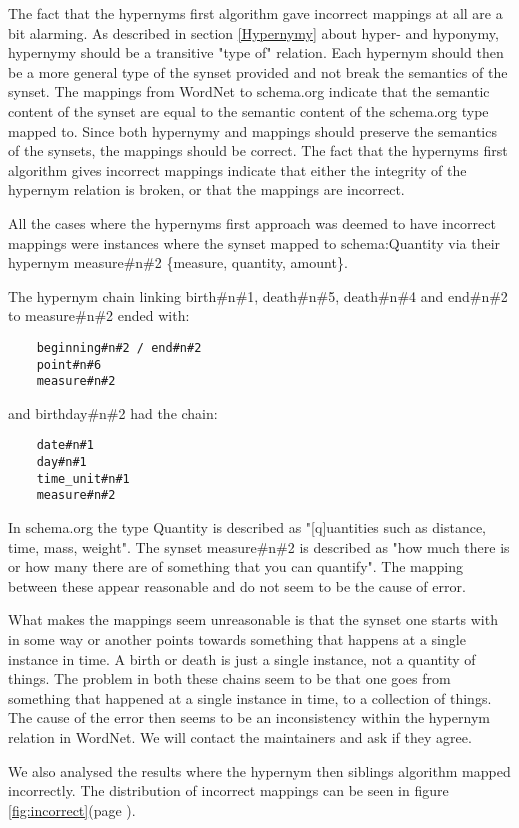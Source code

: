 The fact that the hypernyms first algorithm gave incorrect mappings at all are a bit alarming.
As described in section \ref{Hypernymy} about hyper- and hyponymy, hypernymy should be a transitive "type of" relation.
Each hypernym should then be a more general type of the synset provided and not break the semantics of the synset.
The mappings from WordNet to schema.org indicate that the semantic content of the synset are equal to the
semantic content of the schema.org type mapped to.
Since both hypernymy and mappings should preserve the semantics of the synsets, the mappings should be correct.
The fact that the hypernyms first algorithm gives incorrect mappings indicate that either the integrity of the hypernym relation is broken,
or that the mappings are incorrect.


All the cases where the hypernyms first approach was deemed to have incorrect mappings were instances where the synset
mapped to schema:Quantity via their hypernym measure\#n\#2 \{measure, quantity, amount\}.

The hypernym chain linking birth\#n\#1, death\#n\#5, death\#n\#4 and end\#n\#2 to measure\#n\#2 ended with:
\begin{verbatim}
	beginning#n#2 / end#n#2
	point#n#6
	measure#n#2
\end{verbatim}

and birthday\#n\#2 had the chain:
\begin{verbatim}
	date#n#1
	day#n#1
	time_unit#n#1
	measure#n#2
\end{verbatim}


In schema.org the type Quantity is described as "[q]uantities such as distance, time, mass, weight".
The synset measure\#n\#2 is described as "how much there is or how many there are of something that you can quantify".
The mapping between these appear reasonable and do not seem to be the cause of error.

What makes the mappings seem unreasonable is that the synset one starts with in some way or another points towards
something that happens at a single instance in time.
A birth or death is just a single instance, not a quantity of things.
The problem in both these chains seem to be that one goes from something that happened at a single instance in time,
to a collection of things.
The cause of the error then seems to be an inconsistency within the hypernym relation in WordNet.
We will contact the maintainers and ask if they agree.

We also analysed the results where the hypernym then siblings algorithm mapped incorrectly.
The distribution of incorrect mappings can be seen in figure \ref{fig:incorrect}(page \pageref{fig:incorrect}).

